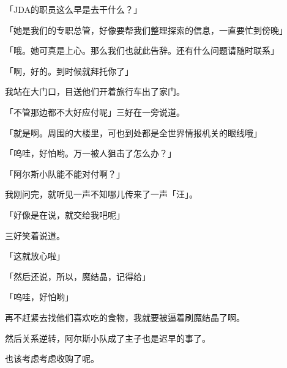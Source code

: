 「JDA的职员这么早是去干什么？」

「她是我们的专职总管，好像要帮我们整理探索的信息，一直要忙到傍晚」

「哦。她可真是上心。那么我们也就此告辞。还有什么问题请随时联系」

「啊，好的。到时候就拜托你了」

我站在大门口，目送他们开着旅行车出了家门。

「不管那边都不大好应付呢」三好在一旁说道。

「就是啊。周围的大楼里，可也到处都是全世界情报机关的眼线哦」

「呜哇，好怕哟。万一被人狙击了怎么办？」

「阿尔斯小队能不能对付啊？」

我刚问完，就听见一声不知哪儿传来了一声「汪」。

「好像是在说，就交给我吧呢」

三好笑着说道。

「这就放心啦」

「然后还说，所以，魔结晶，记得给」

「呜哇，好怕哟」

再不赶紧去找他们喜欢吃的食物，我就要被逼着刷魔结晶了啊。

然后关系逆转，阿尔斯小队成了主子也是迟早的事了。

也该考虑考虑收购了呢。


